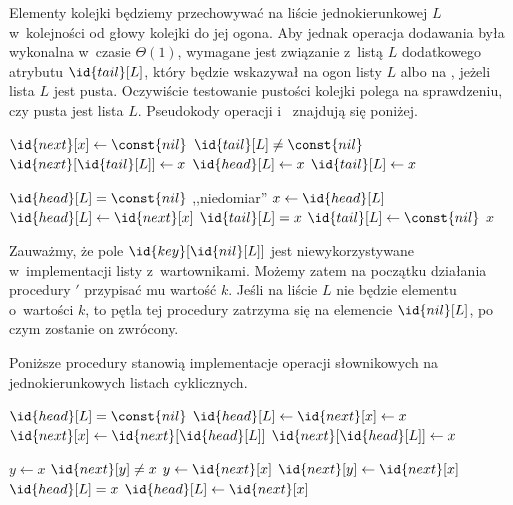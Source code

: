 \exercise %
Elementy kolejki będziemy przechowywać na liście jednokierunkowej $L$ w~kolejności od głowy kolejki do jej ogona. Aby jednak operacja dodawania była wykonalna w~czasie $\Theta(1)$, wymagane jest związanie z~listą $L$ dodatkowego atrybutu $\id{tail}[L]$, który będzie wskazywał na ogon listy $L$ albo na , jeżeli lista $L$ jest pusta. Oczywiście testowanie pustości kolejki polega na sprawdzeniu, czy pusta jest lista $L$. Pseudokody operacji  i~ znajdują się poniżej.
\begin{codebox}
\li	$\id{next}[x]\gets\const{nil}$
\li	\If $\id{tail}[L]\ne\const{nil}$
\li		\Then $\id{next}[\id{tail}[L]]\gets x$
\li		\Else $\id{head}[L]\gets x$
		\End
\li	$\id{tail}[L]\gets x$
\end{codebox}

\begin{codebox}
\li	\If $\id{head}[L]=\const{nil}$
\li		\Then \Error ,,niedomiar''
		\End
\li	$x\gets\id{head}[L]$
\li	$\id{head}[L]\gets\id{next}[x]$
\li	\If $\id{tail}[L]=x$
\li		\Then $\id{tail}[L]\gets\const{nil}$
		\End
\li	\Return $x$
\end{codebox}

\exercise %
Zauważmy, że pole $\id{key}[\id{nil}[L]]$ jest niewykorzystywane w~implementacji listy z~wartownikami. Możemy zatem na początku działania procedury $'$ przypisać mu wartość $k$. Jeśli na liście $L$ nie będzie elementu o~wartości $k$, to pętla tej procedury zatrzyma się na elemencie $\id{nil}[L]$, po czym zostanie on zwrócony.

\exercise %
Poniższe procedury stanowią implementacje operacji słownikowych na jednokierunkowych listach cyklicznych.
\begin{codebox}
\li	\If $\id{head}[L]=\const{nil}$
\li		\Then $\id{head}[L]\gets\id{next}[x]\gets x$
\li		\Else
			$\id{next}[x]\gets\id{next}[\id{head}[L]]$
\li			$\id{next}[\id{head}[L]]\gets x$
		\End
\end{codebox}

\begin{codebox}
\li	$y\gets x$
\li	\While $\id{next}[y]\ne x$
\li		\Do $y\gets\id{next}[x]$
		\End
\li	$\id{next}[y]\gets\id{next}[x]$
\li	\If $\id{head}[L]=x$
\li		\Then $\id{head}[L]\gets\id{next}[x]$
		\End
\end{codebox}

